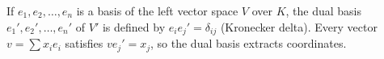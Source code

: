 If $e_1, e_2, \dots, e_n$ is a basis of the left vector space $V$ over $K$, the dual basis $e_1', e_2', \dots, e_n'$ of $V'$ is defined by $e_i e_j' = \delta_{ij}$ (Kronecker delta). Every vector $v = \sum x_i e_i$ satisfies $v e_j' = x_j$, so the dual basis extracts coordinates.
